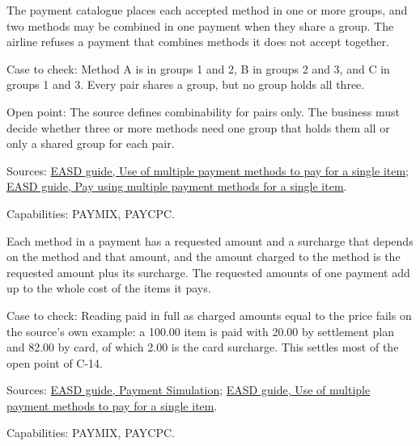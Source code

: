 \begin{definition}
  \label{def:payment-combinable-methods}
  \notready
  The payment catalogue places each accepted method in one or more groups,
  and two methods may be combined in one payment when they share a group.
  The airline refuses a payment that combines methods it does not accept
  together.

  Case to check: Method A is in groups 1 and 2, B in groups 2 and 3, and C
  in groups 1 and 3. Every pair shares a group, but no group holds all
  three.

  Open point: The source defines combinability for pairs only. The business
  must decide whether three or more methods need one group that holds them
  all or only a shared group for each pair.

  Sources: \href{https://standards.atlassian.net/wiki/spaces/EASD/pages/2592899087/Use+of+multiple+payment+methods+to+pay+for+a+single+item}{EASD guide, Use of multiple payment methods to pay for a single item};
  \href{https://standards.atlassian.net/wiki/spaces/EASD/pages/2593325059/Pay+using+multiple+payment+methods+for+a+single+item}{EASD guide, Pay using multiple payment methods for a single item}.

  Capabilities: PAYMIX, PAYCPC.
\end{definition}

\begin{definition}
  \label{def:payment-surcharge-per-method}
  Each method in a payment has a requested amount and a surcharge that
  depends on the method and that amount, and the amount charged to the
  method is the requested amount plus its surcharge. The requested amounts
  of one payment add up to the whole cost of the items it pays.

  Case to check: Reading paid in full as charged amounts equal to the price
  fails on the source's own example: a 100.00 item is paid with 20.00 by
  settlement plan and 82.00 by card, of which 2.00 is the card surcharge.
  This settles most of the open point of C-14.

  Sources: \href{https://standards.atlassian.net/wiki/spaces/EASD/pages/2593030164/Payment+Simulation}{EASD guide, Payment Simulation};
  \href{https://standards.atlassian.net/wiki/spaces/EASD/pages/2592899087/Use+of+multiple+payment+methods+to+pay+for+a+single+item}{EASD guide, Use of multiple payment methods to pay for a single item}.

  Capabilities: PAYMIX, PAYCPC.
\end{definition}

